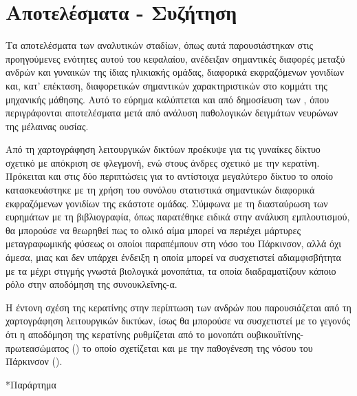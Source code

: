 \documentclass[12pt]{report}
\makeatletter
\let\oldchapter\chapter
\renewcommand{\chapter}{\@ifstar{\starchapter}{\nostarchapter}}
\newcommand{\starchapter}[1]{\oldchapter*{#1}\thispagestyle{mainstyle}}
\newcommand{\nostarchapter}[1]{\oldchapter{#1}\thispagestyle{mainstyle}}
\makeatother
\begin{document}
        \section{Αποτελέσματα - Συζήτηση}
            Τα αποτελέσματα των αναλυτικών σταδίων, όπως αυτά παρουσιάστηκαν στις προηγούμενες ενότητες αυτού του κεφαλαίου, ανέδειξαν σημαντικές διαφορές μεταξύ ανδρών και γυναικών της ίδιας ηλικιακής ομάδας, διαφορικά εκφραζόμενων γονιδίων και, κατ' επέκταση, διαφορετικών σημαντικών χαρακτηριστικών στο κομμάτι της μηχανικής μάθησης. Αυτό το εύρημα καλύπτεται και από δημοσίευση των \cite{Simunovic2010EvidenceDisease}, όπου περιγράφονται αποτελέσματα μετά από ανάλυση παθολογικών δειγμάτων νευρώνων της μέλαινας ουσίας.
            \par
            Από τη χαρτογράφηση λειτουργικών δικτύων προέκυψε για τις γυναίκες δίκτυο σχετικό με απόκριση σε φλεγμονή, ενώ στους άνδρες σχετικό με την κερατίνη. Πρόκειται και στις δύο περιπτώσεις για το αντίστοιχα μεγαλύτερο δίκτυο το οποίο κατασκευάστηκε με τη χρήση του συνόλου στατιστικά σημαντικών διαφορικά εκφραζόμενων γονιδίων της εκάστοτε ομάδας. Σύμφωνα με τη διασταύρωση των ευρημάτων με τη βιβλιογραφία, όπως παρατέθηκε ειδικά στην ανάλυση εμπλουτισμού, θα μπορούσε να θεωρηθεί πως το ολικό αίμα μπορεί να περιέχει μάρτυρες μεταγραφωμικής φύσεως οι οποίοι παραπέμπουν στη νόσο του Πάρκινσον, αλλά όχι άμεσα, μιας και δεν υπάρχει ένδειξη η οποία μπορεί να συσχετιστεί αδιαμφισβήτητα με τα μέχρι στιγμής γνωστά βιολογικά μονοπάτια, τα οποία διαδραματίζουν κάποιο ρόλο στην αποδόμηση της συνουκλεΐνης-α. 
            \par
            Η έντονη σχέση της κερατίνης στην περίπτωση των ανδρών που παρουσιάζεται από τη χαρτογράφηση λειτουργικών δικτύων, ίσως θα μπορούσε να συσχετιστεί με το γεγονός ότι η αποδόμηση της κερατίνης ρυθμίζεται από το μονοπάτι ουβικουϊτίνης-πρωτεασώματος (\emph{\cite{Rogel2010TheDegradation}}) το οποίο σχετίζεται και με την παθογένεση της νόσου του Πάρκινσον (\emph{\cite{Lim2007RoleDisease}}).

        \chapter{Συμπεράσματα}
        
        
    \cleardoublepage
    \appendix
    \chapter*{Παράρτημα}
    
\end{document}
